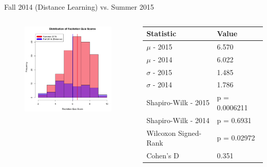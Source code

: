 \documentclass{beamer}
\begin{document}
\begin{frame}{Fall 2014 (Distance Learning) vs. Summer 2015}
\begin{columns}
\begin{column}{2in}
\begin{figure}
	\includegraphics[width=2in]{img/chapter4/rq_su15_vs_f14d}
\end{figure}
\end{column}
\begin{column}{2in}
\begin{scriptsize}
\begin{table}
  \begin{tabular}{|l|l|}
    \hline
    \textbf{Statistic} & \textbf{Value} \\
	\hline
	$\mu$ - 2015 & 6.570 \\
	\hline
	$\mu$ - 2014 & 6.022 \\
	\hline
	$\sigma$ - 2015 & 1.485 \\
	\hline
	$\sigma$ - 2014 & 1.786 \\
	\hline
	Shapiro-Wilk - 2015 & p = 0.0006211 \\
	\hline
	Shapiro-Wilk - 2014 & p = 0.6931 \\
	\hline
	Wilcoxon Signed-Rank & p = 0.02972 \\
	\hline
	Cohen's D & 0.351 \\
	\hline
  \end{tabular}
\end{table}
\end{scriptsize}
\end{column}
\end{columns}
\end{frame}
\end{document}
